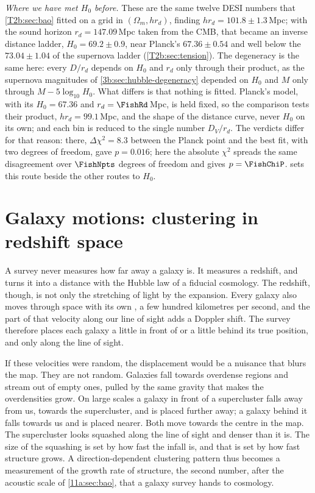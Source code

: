 \emph{Where we have met $H_0$ before.} These are the same twelve DESI numbers that \cref{T2b:sec:bao} fitted on a grid
in $(\Omega_m,hr_d)$, finding $hr_d=101.8\pm1.3$\,Mpc; with the sound horizon $r_d=147.09$\,Mpc taken from the CMB,
that became an inverse distance ladder, $H_0=69.2\pm0.9$, near Planck's $67.36\pm0.54$ and well below the
$73.04\pm1.04$ of the supernova ladder (\cref{T2b:sec:tension}). The degeneracy is the same here: every $D/r_d$
depends on $H_0$ and $r_d$ only through their product, as the supernova magnitudes of \cref{3b:sec:hubble-degeneracy}
depended on $H_0$ and $M$ only through $M-5\log_{10}H_0$. What differs is that nothing is fitted. Planck's model,
with its $H_0=67.36$ and $r_d=\FishRd$\,Mpc, is held fixed, so the comparison tests their product, $hr_d=99.1$\,Mpc,
and the shape of the distance curve, never $H_0$ on its own; and each bin is reduced to the single number $D_V/r_d$.
The verdicts differ for that reason: there, $\Delta\chi^2=8.3$ between the Planck point and the best fit, with two
degrees of freedom, gave $p=0.016$; here the absolute $\chi^2$ spreads the same disagreement over $\FishNpts$ degrees of
freedom and gives $p=\FishChiP$.  sets this route beside the other routes to $H_0$.
\section{Galaxy motions: clustering in redshift space}
\label{11a:sec:rsd}

A survey never measures how far away a galaxy is. It measures a redshift, and
turns it into a distance with the Hubble law of a fiducial cosmology. The
redshift, though, is not only the stretching of light by the expansion. Every
galaxy also moves through space with its own , a few
hundred kilometres per second, and the part of that velocity along our line of
sight adds a Doppler shift. The survey therefore places each galaxy a little in
front of or a little behind its true position, and only along the line of sight.

If these velocities were random, the displacement would be a nuisance that blurs
the map. They are not random. Galaxies fall towards overdense regions and stream
out of empty ones, pulled by the same gravity that makes the overdensities grow.
On large scales a galaxy in front of a supercluster falls away from us, towards
the supercluster, and is placed further away; a galaxy behind it falls towards
us and is placed nearer. Both move towards the centre in the map. The
supercluster looks squashed along the line of sight and denser than it is. The
size of the squashing is set by how fast the infall is, and that is set by how
fast structure grows. A direction-dependent clustering pattern thus becomes a
measurement of the growth rate of structure, the second number, after the
acoustic scale of \cref{11a:sec:bao}, that a galaxy survey hands to cosmology.

